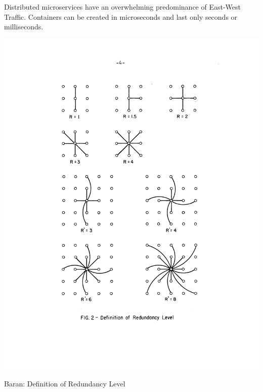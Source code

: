  Distributed microservices have an overwhelming predominance of East-West Traffic.  Containers can be created in microseconds and last only seconds or milliseconds.
 

 
 \begin{marginfigure}
  \includegraphics[width=\linewidth]{../../FIGURES/Baran-redundancy.pdf}
  \caption{Baran: Definition of Redundancy Level}
    \vspace{12pt}
\end{marginfigure}


